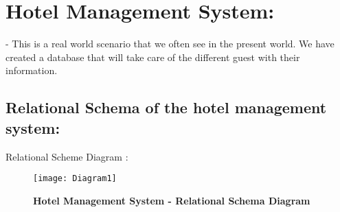 \documentclass[a4,12pt]{report}
\begin{document}
\section*{Hotel Management System:} -
This is a real world scenario that we often see in the present world. We have created a database that will take care of the different guest with their information.\\
\subsection*{Relational Schema of the hotel management system:}
Relational Scheme Diagram :\\
\begin{figure}[hbtp]
\centering
\texttt{[image: Diagram1]} \\

\caption{\textbf{{\color{red}Hotel Management System - Relational Schema Diagram}}}
\end{figure}
\newpage
\end{document}
